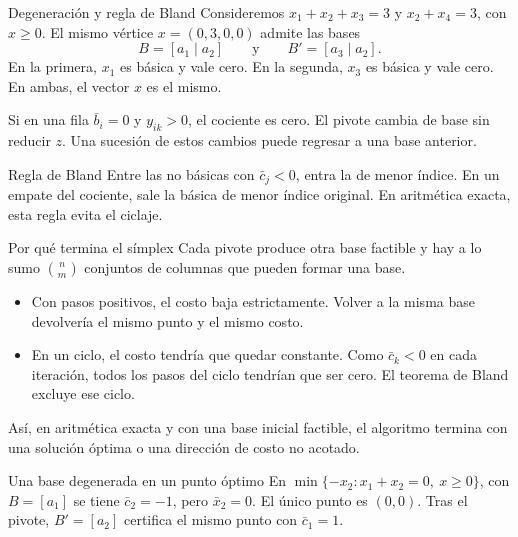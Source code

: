 \documentclass[aspectratio=169,12pt]{beamer}
\begin{document}
\begin{frame}{Degeneración y regla de Bland}
Consideremos $x_1+x_2+x_3=3$ y $x_2+x_4=3$, con $x\ge0$.
El mismo vértice $x=(0,3,0,0)$ admite las bases
\[
 B=[a_1\mid a_2]\qquad\text{y}\qquad B'=[a_3\mid a_2].
\]
En la primera, $x_1$ es básica y vale cero. En la segunda,
$x_3$ es básica y vale cero. En ambas, el vector $x$ es el mismo.
\medskip

Si en una fila $\bar b_i=0$ y $y_{ik}>0$, el cociente es cero.
El pivote cambia de base sin reducir $z$. Una sucesión de estos cambios
puede regresar a una base anterior.
\begin{block}{Regla de Bland}
Entre las no básicas con $\bar c_j<0$, entra la de menor índice.
En un empate del cociente, sale la básica de menor índice original.
En aritmética exacta, esta regla evita el ciclaje.
\end{block}
\end{frame}

\begin{frame}[label=teoria-terminacion]{Por qué termina el símplex}
Cada pivote produce otra base factible y hay a lo sumo
$\binom{n}{m}$ conjuntos de columnas que pueden formar una base.
\begin{itemize}
\item Con pasos positivos, el costo baja estrictamente. Volver a
      la misma base devolvería el mismo punto y el mismo costo.
\item En un ciclo, el costo tendría que quedar constante. Como
      $\bar c_k<0$ en cada iteración, todos los pasos del ciclo
      tendrían que ser cero. El teorema de Bland excluye ese ciclo.
\end{itemize}
Así, en aritmética exacta y con una base inicial factible, el algoritmo
termina con una solución óptima o una dirección de costo no acotado.
\begin{block}{Una base degenerada en un punto óptimo}
En $\min\{-x_2:x_1+x_2=0,\ x\ge0\}$, con $B=[a_1]$ se tiene
$\bar c_2=-1$, pero $\bar x_2=0$. El único punto es $(0,0)$.
Tras el pivote, $B'=[a_2]$ certifica el mismo punto con $\bar c_1=1$.
\end{block}
\end{frame}
\end{document}
